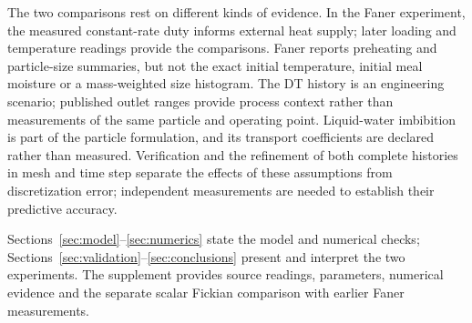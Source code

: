 The two comparisons rest on different kinds of evidence. In the Faner
experiment, the measured constant-rate duty informs external heat
supply; later loading and temperature readings provide the comparisons.
Faner reports preheating and particle-size summaries, but not the exact
initial temperature, initial meal moisture or a mass-weighted size
histogram. The DT history is an engineering scenario; published outlet
ranges provide process context rather than measurements of the same
particle and operating point. Liquid-water imbibition is part of the particle
formulation, and its transport coefficients are declared rather than
measured. Verification and the refinement of both complete histories
in mesh and time step separate the effects of these assumptions from
discretization error; independent measurements are needed to establish their predictive
accuracy.

Sections~\ref{sec:model}--\ref{sec:numerics} state the model and numerical
checks; Sections~\ref{sec:validation}--\ref{sec:conclusions} present and
interpret the two experiments. The supplement provides source readings,
parameters, numerical evidence and the separate scalar Fickian comparison
with earlier Faner measurements.
